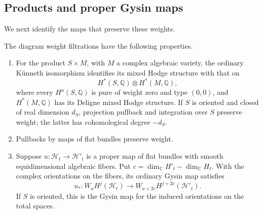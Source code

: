 \subsection{Products and proper Gysin maps}

We next identify the maps that preserve these weights.

\begin{proposition}
 \label{diag:gysin}
 The diagram weight filtrations have the following properties.
 \begin{enumerate}
 \item For the product $S\times M$, with $M$ a complex algebraic
 variety, the ordinary K\"unneth isomorphism identifies its mixed Hodge
 structure with that on
 \[
 H^*(S,\mathbb Q)\otimes H^*(M,\mathbb Q),
 \]
 where every $H^a(S,\mathbb Q)$ is pure of weight zero and type $(0,0)$,
 and $H^*(M,\mathbb Q)$ has its Deligne mixed Hodge structure.
 If $S$ is oriented and closed of real dimension $d_S$, projection
 pullback and integration over $S$ preserve weight; the latter has
 cohomological degree $-d_S$.
 \item Pullbacks by maps of flat bundles preserve weight.
 \item Suppose $u:\mathscr H_t\to\mathscr H'_t$ is a proper map of
 flat bundles with smooth equidimensional algebraic fibers.  Put
 $c=\dim_{\mathbb C}H'_t-\dim_{\mathbb C}H_t$.  With the complex
 orientations on the fibers, its ordinary Gysin map satisfies
 \[
 u_*:W_aH^j(\mathscr H_t)\longrightarrow
       W_{a+2c}H^{j+2c}(\mathscr H'_t).
 \]
 If $S$ is oriented, this is the Gysin map for the induced orientations
 on the total spaces.
 \end{enumerate}
\end{proposition}

